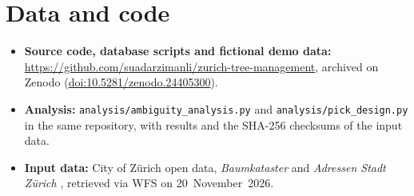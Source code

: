\documentclass[11pt,a4paper]{article}
\newcommand{\repourl}{https://github.com/suadarzimanli/zurich-tree-management}
\newcommand{\archivedoi}{(\href{https://doi.org/10.5281/zenodo.24405300}{doi:10.5281/zenodo.24405300})}
\begin{document}
\section*{Data and code}

\begin{itemize}
  \item \textbf{Source code, database scripts and fictional demo data:} \url{\repourl}, archived on Zenodo \archivedoi.
  \item \textbf{Analysis:} \texttt{analysis/ambiguity\_analysis.py} and \texttt{analysis/pick\_design.py} in the same repository, with results and the SHA-256 checksums of the input data.
  \item \textbf{Input data:} City of Zürich open data, \emph{Baumkataster} \cite{zh-baum} and \emph{Adressen Stadt Zürich} \cite{zh-adr}, retrieved via WFS on 20~November~2026.
\end{itemize}
\end{document}

